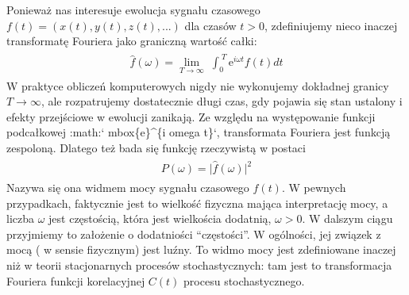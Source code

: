 \documentclass[a4paper,12pt,polish]{sphinxmanual}
\begin{document}
Ponieważ nas interesuje ewolucja sygnału czasowego $f(t) = (x(t),  y(t),  z(t), ...)$ dla czasów $t>0$, zdefiniujemy nieco inaczej transformatę  Fouriera  jako graniczną wartość całki:
\label{ch2/chII012:equation-eqn21}\begin{gather}
\begin{split}{\hat f}(\omega) = \lim_{T\to\infty}  \; \int_{0}^{\; T}  \mbox{e}^{i \omega t} f(t)  dt\end{split}\label{ch2/chII012-eqn21}
\end{gather}
W praktyce obliczeń komputerowych nigdy nie wykonujemy dokładnej granicy $T\to \infty$, ale rozpatrujemy dostatecznie długi czas, gdy pojawia się stan ustalony i efekty przejściowe w ewolucji zanikają.  Ze względu na występowanie funkcji  podcałkowej  :math:{}` mbox\{e\}\textasciicircum{}\{i omega t\}{}`, transformata Fouriera jest  funkcją  zespoloną. Dlatego też bada się funkcję rzeczywistą w postaci
\label{ch2/chII012:equation-eqn22}\begin{gather}
\begin{split}P(\omega) = \lvert {\hat f}(\omega) \rvert^2\end{split}\label{ch2/chII012-eqn22}
\end{gather}
Nazywa się ona widmem mocy sygnału czasowego $f(t)$. W pewnych przypadkach, faktycznie jest to wielkość fizyczna mająca interpretację mocy, a liczba  $\omega$ jest częstością, która jest wielkościa dodatnią, $\omega > 0$.  W dalszym ciągu przyjmiemy to założenie o dodatniości ``częstości''. W ogólności, jej związek z mocą ( w sensie fizycznym) jest luźny. To widmo mocy jest zdefiniowane inaczej niż w teorii stacjonarnych procesów stochastycznych: tam jest to transformacja Fouriera funkcji korelacyjnej $C(t)$  procesu stochastycznego.
\end{document}
